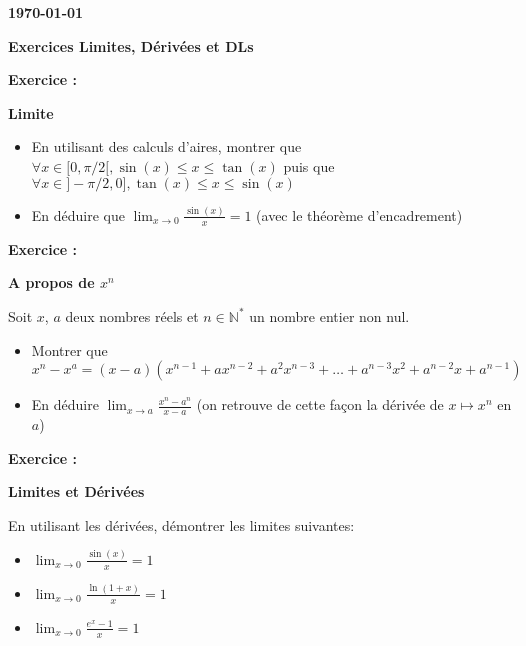 \documentclass[a4paper,12pt]{article}
\def\Exam{Exercices \og Limites, Dérivées et DLs\fg{}}
\def\Date{\today}
\begin{document}
\setcounter{nexo}{1}
\newcommand{\Exo}{\medskip
  {\bf Exercice \arabic{nexo} : }
  \addtocounter{nexo}{1}}
\newcommand{\Pb}{{\bf Problème \arabic{nexo} : }
\addtocounter{nexo}{1} \bigskip}
{\bf  \hfill \Date \quad ~}
%
\vskip 1cm
%
\centerline{\bf \LARGE \Exam}
%
\vskip 1.5cm
%




\Exo \textbf{Limite}

\begin{itemize}
\item En utilisant des calculs d'aires, montrer que $\forall  x \in [0, \pi/2[, \sin(x) \leq x \leq \tan(x)$ puis que $\forall  x \in ]-\pi/2, 0], \tan(x) \leq x \leq \sin(x)$
\item En déduire que $\displaystyle \lim_{x \to 0} \frac{\sin(x)}{x} = 1$ (avec le théorème d'encadrement)
\end{itemize}

\Exo \textbf{A propos de $x^n$}

Soit $x$, $a$ deux nombres réels et $n \in \mathbb{N}^*$ un nombre entier non nul.

\begin{itemize}
\item Montrer que $x^n - x^a = (x - a)(x^{n-1} + ax^{n-2} + a^2x^{n-3} + \dots + a^{n-3}x^{2} + a^{n-2}x + a^{n-1})$
\item En déduire $\displaystyle \lim_{x \to a} \frac{x^{n} - a^n}{x - a}$ (on retrouve de cette façon la dérivée de $x \mapsto x^n$ en $a$)
\end{itemize}

\Exo \textbf{Limites et Dérivées}

En utilisant les dérivées, démontrer les limites suivantes:

\begin{itemize}
\item $\displaystyle \lim_{x \to 0} \frac{\sin(x)}{x} = 1$
\item $\displaystyle \lim_{x \to 0} \frac{\ln(1+x)}{x} = 1$
\item $\displaystyle \lim_{x \to 0} \frac{e^x - 1}{x} = 1$
\end{itemize}
\end{document}
